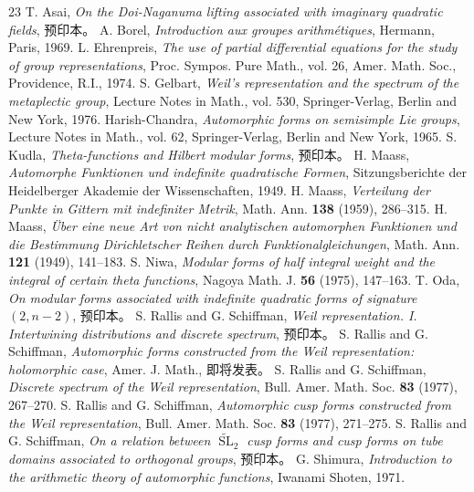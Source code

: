 \begin{thebibliography}{23}
 T. Asai, \emph{On the Doi-Naganuma lifting associated with imaginary quadratic fields}, 预印本。
 A. Borel, \emph{Introduction aux groupes arithmétiques}, Hermann, Paris, 1969.
 L. Ehrenpreis, \emph{The use of partial differential equations for the study of group representations}, Proc. Sympos. Pure Math., vol. 26, Amer. Math. Soc., Providence, R.I., 1974.
 S. Gelbart, \emph{Weil's representation and the spectrum of the metaplectic group}, Lecture Notes in Math., vol. 530, Springer-Verlag, Berlin and New York, 1976.
 Harish-Chandra, \emph{Automorphic forms on semisimple Lie groups}, Lecture Notes in Math., vol. 62, Springer-Verlag, Berlin and New York, 1965.
 S. Kudla, \emph{Theta-functions and Hilbert modular forms}, 预印本。
 H. Maass, \emph{Automorphe Funktionen und indefinite quadratische Formen}, Sitzungsberichte der Heidelberger Akademie der Wissenschaften, 1949.
 H. Maass, \emph{Verteilung der Punkte in Gittern mit indefiniter Metrik}, Math. Ann. \textbf{138} (1959), 286--315.
 H. Maass, \emph{Über eine neue Art von nicht analytischen automorphen Funktionen und die Bestimmung Dirichletscher Reihen durch Funktionalgleichungen}, Math. Ann. \textbf{121} (1949), 141--183.
 S. Niwa, \emph{Modular forms of half integral weight and the integral of certain theta functions}, Nagoya Math. J. \textbf{56} (1975), 147--163.
 T. Oda, \emph{On modular forms associated with indefinite quadratic forms of signature $(2,n-2)$}, 预印本。
 S. Rallis and G. Schiffman, \emph{Weil representation. I. Intertwining distributions and discrete spectrum}, 预印本。
 S. Rallis and G. Schiffman, \emph{Automorphic forms constructed from the Weil representation: holomorphic case}, Amer. J. Math., 即将发表。
 S. Rallis and G. Schiffman, \emph{Discrete spectrum of the Weil representation}, Bull. Amer. Math. Soc. \textbf{83} (1977), 267--270.
 S. Rallis and G. Schiffman, \emph{Automorphic cusp forms constructed from the Weil representation}, Bull. Amer. Math. Soc. \textbf{83} (1977), 271--275.
 S. Rallis and G. Schiffman, \emph{On a relation between $\widetilde{\operatorname{SL}}_2$ cusp forms and cusp forms on tube domains associated to orthogonal groups}, 预印本。
 G. Shimura, \emph{Introduction to the arithmetic theory of automorphic functions}, Iwanami Shoten, 1971.

\end{thebibliography}
